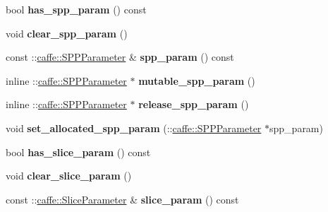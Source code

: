 \begin{DoxyCompactItemize}
bool {\bfseries has\+\_\+spp\+\_\+param} () const
\item 
\mbox{\label{classcaffe_1_1_layer_parameter_a4b1796da0022fc31577bcbf0a21ff9aa}} 
void {\bfseries clear\+\_\+spp\+\_\+param} ()
\item 
\mbox{\label{classcaffe_1_1_layer_parameter_a6654c6bac02bdb78f7fabec5f2e8372d}} 
const \+::\mbox{\hyperlink{classcaffe_1_1_s_p_p_parameter}{caffe\+::\+S\+P\+P\+Parameter}} \& {\bfseries spp\+\_\+param} () const
\item 
\mbox{\label{classcaffe_1_1_layer_parameter_ad5b22846eeb409e8dec781937e018e3b}} 
inline \+::\mbox{\hyperlink{classcaffe_1_1_s_p_p_parameter}{caffe\+::\+S\+P\+P\+Parameter}} $\ast$ {\bfseries mutable\+\_\+spp\+\_\+param} ()
\item 
\mbox{\label{classcaffe_1_1_layer_parameter_adaf875eab4df789bd99cb27e156df43f}} 
inline \+::\mbox{\hyperlink{classcaffe_1_1_s_p_p_parameter}{caffe\+::\+S\+P\+P\+Parameter}} $\ast$ {\bfseries release\+\_\+spp\+\_\+param} ()
\item 
\mbox{\label{classcaffe_1_1_layer_parameter_a536ff5eab22a78270a40d02865f89c30}} 
void {\bfseries set\+\_\+allocated\+\_\+spp\+\_\+param} (\+::\mbox{\hyperlink{classcaffe_1_1_s_p_p_parameter}{caffe\+::\+S\+P\+P\+Parameter}} $\ast$spp\+\_\+param)
\item 
\mbox{\label{classcaffe_1_1_layer_parameter_adbb27a46d6a8a6de6f4eb8201027cbd1}} 
bool {\bfseries has\+\_\+slice\+\_\+param} () const
\item 
\mbox{\label{classcaffe_1_1_layer_parameter_a5cd0f99f5affaf0ea95a4913e1615de7}} 
void {\bfseries clear\+\_\+slice\+\_\+param} ()
\item 
\mbox{\label{classcaffe_1_1_layer_parameter_a2f208b05750df9ed85ad72e7d44d2acf}} 
const \+::\mbox{\hyperlink{classcaffe_1_1_slice_parameter}{caffe\+::\+Slice\+Parameter}} \& {\bfseries slice\+\_\+param} () const
\item 
\mbox{\label{classcaffe_1_1_layer_parameter_a1c75f8cacbf99ab3a7a61e4dd1af26f8}} 

\end{DoxyCompactItemize}
